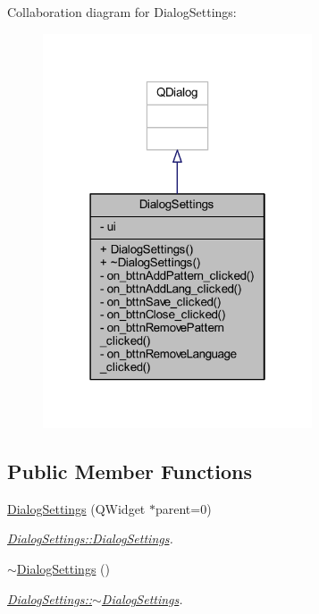 Collaboration diagram for Dialog\+Settings\+:
\nopagebreak
\begin{figure}[H]
\begin{center}
\leavevmode
\includegraphics[width=226pt]{class_dialog_settings__coll__graph}
\end{center}
\end{figure}
\subsection*{Public Member Functions}
\begin{DoxyCompactItemize}
\item 
\hyperlink{class_dialog_settings_afd62a031c10ddfa1fc50f8f5ade07db4}{Dialog\+Settings} (Q\+Widget $\ast$parent=0)
\begin{DoxyCompactList}\small\item\em \hyperlink{class_dialog_settings_afd62a031c10ddfa1fc50f8f5ade07db4}{Dialog\+Settings\+::\+Dialog\+Settings}. \end{DoxyCompactList}\item 
\hyperlink{class_dialog_settings_a10e028cc22f2ab2367f582242fd8115e}{$\sim$\+Dialog\+Settings} ()
\begin{DoxyCompactList}\small\item\em \hyperlink{class_dialog_settings_a10e028cc22f2ab2367f582242fd8115e}{Dialog\+Settings\+::$\sim$\+Dialog\+Settings}. \end{DoxyCompactList}\end{DoxyCompactItemize}
